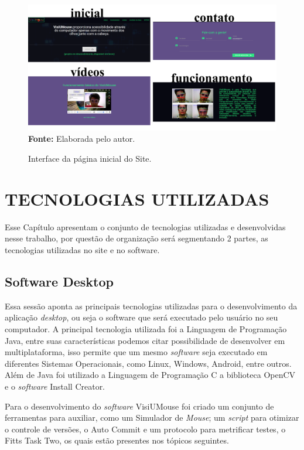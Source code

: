 \begin{figure}[htbp]
\caption{Interface da página inicial do Site.} 
\centering \includegraphics[scale=.165]{img/site.png}
\textbf{Fonte:} Elaborada pelo autor.
\label{fig:site}
\end{figure}

\chapter{TECNOLOGIAS UTILIZADAS}\label{CAP6-tecnilogias-utilizadas}
Esse Capítulo apresentam o conjunto de tecnologias utilizadas e desenvolvidas nesse trabalho, por questão de organização será segmentando 2 partes, as tecnologias utilizadas no site e no software.

\section{Software Desktop}\label{Sub:tecnologias-software}
Essa sessão aponta as principais tecnologias utilizadas para o desenvolvimento da aplicação \textit{desktop}, ou seja o software que será executado pelo usuário no seu computador. A principal tecnologia utilizada foi a Linguagem de Programação Java, entre suas características podemos citar possibilidade de desenvolver em multiplataforma, isso permite que um mesmo \textit{software} seja executado em diferentes Sistemas Operacionais, como Linux, Windows, Android, entre outros. Além de Java foi utilizado a Linguagem de Programação C a biblioteca OpenCV e o \textit{software} Install Creator. 

Para o desenvolvimento do \textit{software} VisiUMouse foi criado um conjunto de ferramentas para auxiliar, como um Simulador de \textit{Mouse}; um \textit{script} para otimizar o controle de versões, o Auto Commit e um protocolo para metrificar testes, o Fitts Task Two, os quais estão presentes nos tópicos seguintes.

